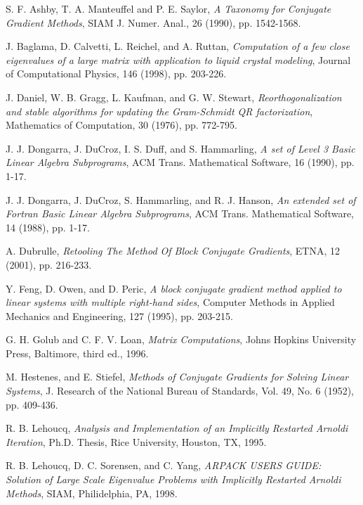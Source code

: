 \documentclass{article}
\begin{document}
\begin{thebibliography}{AAAA99}

 S. F. Ashby, T. A. Manteuffel and P. E.
Saylor, {\em A Taxonomy for Conjugate Gradient Methods}, SIAM
J. Numer. Anal., 26 (1990), pp. 1542-1568.

 J. Baglama, D. Calvetti, L. Reichel, and A.
Ruttan, {\em Computation of a few close eigenvalues of a large
matrix with application to liquid crystal modeling}, Journal of
Computational Physics, 146 (1998), pp. 203-226.

 J. Daniel, W. B. Gragg, L. Kaufman, and G. W.
Stewart, {\em Reorthogonalization and stable algorithms for
updating the Gram-Schmidt QR factorization}, Mathematics of
Computation, 30 (1976), pp. 772-795.

 J. J. Dongarra, J. DuCroz, I. S. Duff, and S.
Hammarling, {\em A set of Level 3 Basic Linear Algebra
Subprograms}, ACM Trans. Mathematical Software, 16 (1990), pp.
1-17.

 J. J. Dongarra, J. DuCroz, S. Hammarling, and
R. J. Hanson, {\em An extended set of Fortran Basic Linear Algebra
Subprograms}, ACM Trans. Mathematical Software, 14 (1988), pp.
1-17.

 A. Dubrulle, {\em Retooling The Method Of
Block Conjugate Gradients}, ETNA, 12 (2001), pp. 216-233.

 Y. Feng, D. Owen, and D. Peric, {\em A
block conjugate gradient method applied to linear systems with
multiple right-hand sides}, Computer Methods in Applied Mechanics
and Engineering, 127 (1995), pp. 203-215.

 G. H. Golub and C. F. V. Loan, {\em Matrix
Computations}, Johns Hopkins University Press, Baltimore, third
ed., 1996.

 M. Hestenes, and E. Stiefel, {\em Methods of
Conjugate Gradients for Solving Linear Systems}, J. Research of
the National Bureau of Standards, Vol. 49, No. 6 (1952), pp.
409-436.

 R. B. Lehoucq, {\em Analysis and Implementation
of an Implicitly Restarted Arnoldi Iteration}, Ph.D. Thesis, Rice
University, Houston, TX, 1995.

 R. B. Lehoucq, D. C. Sorensen, and C. Yang,
{\em ARPACK USERS GUIDE: Solution of Large Scale Eigenvalue
Problems with Implicitly Restarted Arnoldi Methods}, SIAM,
Philidelphia, PA, 1998.


\end{thebibliography}
\end{document}
